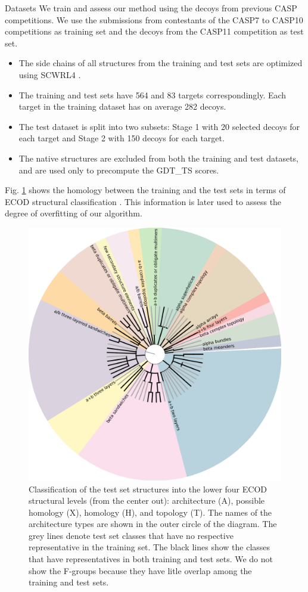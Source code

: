\documentclass[final, unknownkeysallowed]{beamer}
\begin{document}
\begin{frame}{}
\begin{textblock}{39.0}
\begin{block}{Datasets}
We train and assess our method using the decoys from previous CASP
competitions. We use the submissions from contestants of the CASP7 to
CASP10 competitions as training set and the decoys from the CASP11
competition as test set.
\begin{itemize}
\item The side chains of all structures from the training and test
  sets are optimized using SCWRL4 \cite{krivov2009improved}.
\item The training and test sets have 564 and 83 targets
  correspondingly. Each target in the training dataset has on average
  282 decoys.
\item The test dataset is split into two subsets: Stage 1 with 20
  selected decoys for each target and Stage 2 with 150 decoys for each
  target.
\item The native structures are excluded from both the training and
  test datasets, and are used only to precompute the GDT\_TS scores.
\end{itemize}

\vspace{0.5cm}
Fig. \ref{Fig:foldsGraph} shows the homology between the training and
the test sets in terms of ECOD structural classification
\cite{cheng2014ecod}.  This information is later used to assess the
degree of overfitting of our algorithm.

\begin{figure}[H]
    \centering
    \includegraphics[width=0.50\linewidth]{../draft/Fig/folds_graph.png}
%
    \captionsetup{width=0.8\linewidth}
    \caption{Classification of the test set structures into the lower
    four ECOD structural levels (from the center out): architecture
    (A), possible homology (X), homology (H), and topology (T). The
    names of the architecture types are shown in the outer circle of
    the diagram.
    The grey lines denote test set classes that have no
    respective representative in the training set. The black lines
    show the classes that have representatives in both training and
    test sets. We do not show the F-groups because they have litle
    overlap among the training and test sets.
}
%
    \label{Fig:foldsGraph}
\end{figure}
\end{block}


\end{textblock}
\end{frame}
\end{document}
